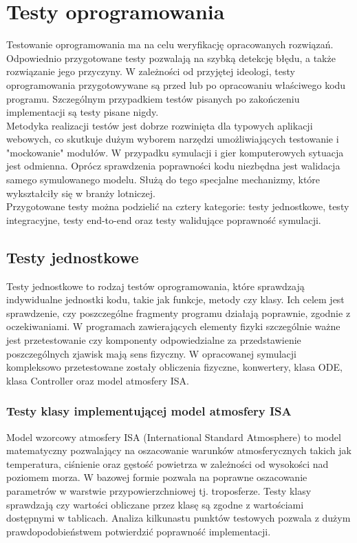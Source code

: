 \section{Testy oprogramowania}

Testowanie oprogramowania ma na celu weryfikację opracowanych rozwiązań. Odpowiednio przygotowane testy pozwalają na szybką detekcję błędu, a także rozwiązanie jego przyczyny. W zależności od przyjętej ideologi, testy oprogramowania przygotowywane są przed lub po opracowaniu właściwego kodu programu. Szczególnym przypadkiem testów pisanych po zakończeniu implementacji są testy pisane nigdy.\\

Metodyka realizacji testów jest dobrze rozwinięta dla typowych aplikacji webowych, co skutkuje dużym wyborem narzędzi umożliwiających testowanie i "mockowanie" modułów. W przypadku symulacji i gier komputerowych sytuacja jest odmienna. Oprócz sprawdzenia poprawności kodu niezbędna jest walidacja samego symulowanego modelu. Służą do tego specjalne mechanizmy, które wykształciły się w branży lotniczej.\\

Przygotowane testy można podzielić na cztery kategorie: testy jednostkowe, testy integracyjne, testy end-to-end oraz testy walidujące poprawność symulacji.

\subsection{Testy jednostkowe}

Testy jednostkowe to rodzaj testów oprogramowania, które sprawdzają indywidualne jednostki kodu, takie jak funkcje, metody czy klasy. Ich celem jest sprawdzenie, czy poszczególne fragmenty programu działają poprawnie, zgodnie z oczekiwaniami.
W programach zawierających elementy fizyki szczególnie ważne jest przetestowanie czy komponenty odpowiedzialne za przedstawienie poszczególnych zjawisk mają sens fizyczny.
W opracowanej symulacji kompleksowo przetestowane zostały obliczenia fizyczne, konwertery, klasa ODE, klasa Controller oraz model atmosfery ISA. 

\subsubsection{Testy klasy implementującej model atmosfery ISA}

Model wzorcowy atmosfery ISA (International Standard Atmosphere) to model matematyczny pozwalający na oszacowanie warunków atmosferycznych takich jak temperatura, ciśnienie oraz gęstość powietrza w zależności od wysokości nad poziomem morza. W bazowej formie pozwala na poprawne oszacowanie parametrów w warstwie przypowierzchniowej tj. troposferze. Testy klasy sprawdzają czy wartości obliczane przez klasę są zgodne z wartościami dostępnymi w tablicach. Analiza kilkunastu punktów testowych pozwala z dużym prawdopodobieństwem potwierdzić poprawność implementacji.

